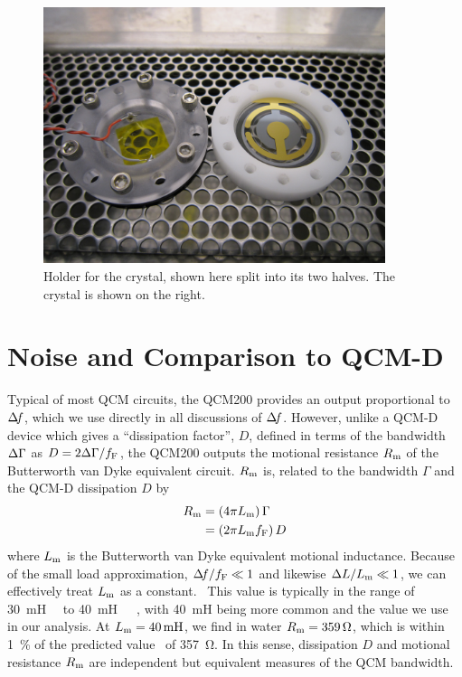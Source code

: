 \begin{figure}[ht]
\centering
\includegraphics[width=10cm,keepaspectratio]{qcm/figures/qcm_holderdiss.jpg}
\caption{Holder for the crystal, shown here split into its two halves.  The
crystal is shown on the right.}
\label{fig:cfqcmexpsetup}
\end{figure}

\section{Noise and Comparison to QCM-D} \label{sec:suppqcmdcomp}
Typical of most QCM circuits, the QCM200 provides an output proportional to
$\Delta\!f$, which we use directly in all discussions of $\Delta\!f$.  However, unlike
a QCM-D device which gives a ``dissipation factor'', $D$, defined in
terms of the bandwidth $\Delta\Gamma$ as $D=2\Delta\Gamma/f_\mathrm{F}$, the QCM200
outputs the motional resistance $R_\mathrm{m}$ of the Butterworth van Dyke
equivalent circuit.  $R_\mathrm{m}$ is, related to
the bandwidth $\Gamma$ and the QCM-D dissipation $D$ by 
\begin{align}
 R_\mathrm{m}&=\left(4 \pi L_\mathrm{m}\right) \Gamma\\
 &=\left(2 \pi L_\mathrm{m} f_\mathrm{F}\right) D
\end{align}
where $L_\mathrm{m}$ is the Butterworth van Dyke equivalent motional inductance.
Because of the small load approximation, $\Delta\!f/f_\mathrm{F} \ll 1$ and
likewise $\Delta L/L_\mathrm{m} \ll 1$, we can effectively treat $L_\mathrm{m}$ as a
constant.~\cite{geelhood2002transient}
This value is
typically in the range of
\SI{30}{\milli\henry}~\cite{srsqcm200manual}~\cite{hussain2005ots} to
\SI{40}{\milli\henry}~\cite{gottschling2000detection}~\cite{arnau2002circuit}~\cite{snellings2001response},
with \SI{40}{\milli\henry} being more common and the value we use in our
analysis.  At $\Lm=\SI{40}{\milli\henry}$, we find in water
$R_\mathrm{m}=\SI{359}{\ohm}$, which is within \SI{1}{\percent} of the predicted
value~\cite{kanazawa1985frequency} of \SI{357}{\ohm}.  In this sense,
dissipation $D$ and motional resistance $R_\mathrm{m}$ are independent but
equivalent measures of the QCM bandwidth.


